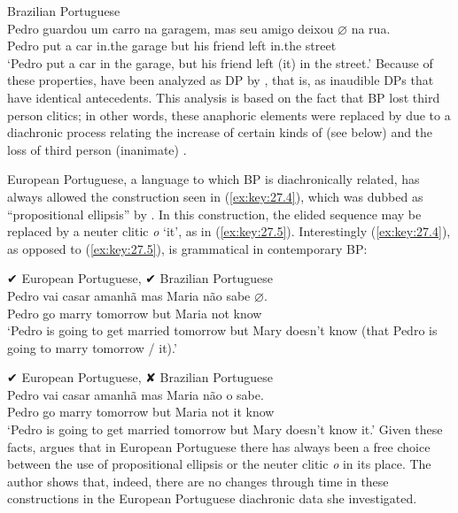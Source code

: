\documentclass[output=paper]{langsci/langscibook}
\begin{document}
\ea\label{ex:key:27.3} Brazilian Portuguese\\
    \gll    Pedro guardou um carro na garagem, mas seu amigo deixou \textbf{$\varnothing$} na rua.\\
            Pedro put a     car       in.the   garage      but  his friend left {} in.the   street\\
    \glt    `Pedro put a car in the garage, but his friend left (it) in the street.'
\z
Because of these properties,  have been analyzed as DP
 by \citet{Cyrino1994,Cyrino1997}, that is, as inaudible DPs that
have identical antecedents.  This analysis is based on the fact that
\gls{BP} lost third person
clitics; in other words, these anaphoric elements were replaced by
 due to a diachronic process relating the increase of certain
kinds of  (see below) and the loss of third person (inanimate) .

 European Portuguese, a language to which \gls{BP} is diachronically related, has
 always allowed the construction seen in (\ref{ex:key:27.4}), which was dubbed as
 ``propositional ellipsis'' by \citet{Cyrino1994,Cyrino1997}. In this
 construction, the elided sequence may be replaced by a neuter clitic
 \emph{o} `it', as in (\ref{ex:key:27.5}).  Interestingly (\ref{ex:key:27.4}), as
 opposed to (\ref{ex:key:27.5}), is grammatical in contemporary \gls{BP}:

\ea \label{ex:key:27.4} ✔ European Portuguese, ✔ Brazilian Portuguese\\
    \gll    Pedro vai casar amanhã   mas Maria  não sabe \textbf{$\varnothing$}.\\
            Pedro go marry tomorrow but   Maria  not  know\\
    \glt    `Pedro is going to get married tomorrow but Mary doesn't know (that Pedro is going to marry tomorrow / it).'
\z

\ea \label{ex:key:27.5} ✔ European Portuguese, ✘ Brazilian Portuguese\\
    \gll   Pedro vai    casar amanhã    mas Maria  não o sabe.\\
            Pedro go   marry tomorrow but Maria    not  it know\\
    \glt    `Pedro is going to get married tomorrow but Mary doesn't       know it.'
\z
Given these facts, \citet{Cyrino1994,Cyrino1997} argues that in European
Portuguese there has always been a free choice between the use of propositional
ellipsis or the neuter clitic \emph{o} in its place. The author shows that,
indeed, there are no changes through time in these constructions in the
European Portuguese diachronic data she investigated.
\end{document}
